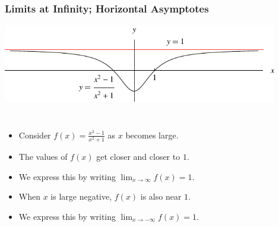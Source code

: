 \begin{frame}
\frametitle{Limits at Infinity; Horizontal Asymptotes}
\includegraphics[width=12cm]{curve-sketching/pictures/04-04-intro.pdf}%
\begin{columns}[c]
%
\begin{itemize}
\item  Consider $f(x) = \frac{x^2-1}{x^2+1}$ as $x$ becomes large.
\item<2->  The values of $f(x)$ get closer and closer to $1$.
\item<3->  We express this by writing $\lim_{x\to \infty} f(x) = 1$.
\item<4->  When $x$ is large negative, $f(x)$ is also near $1$.
\item<5->  We express this by writing $\lim_{x\to -\infty} f(x) = 1$.
\end{itemize}
\end{columns}
\end{frame}
